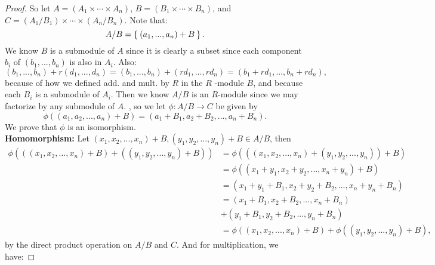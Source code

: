\documentclass[10pt,oneside,reqno]{amsart}
\theoremstyle{plain}
\theoremstyle{definition}
\theoremstyle{remark}
\begin{document}
\begin{enumerate}[label=\arabic*.]
\begin{proof}
So let $A = (A_1 \times \cdots \times A_n)$, $B = (B_1 \times \cdots \times B_n)$, and $C = (A_1/B_1) \times \cdots \times (A_n/B_n)$. Note that: 
$$
A/B = \Set{(a_1,...,a_n) + B}.
$$
We know $B$ is a submodule of $A$ since it is clearly a subset since each component $b_i$ of $(b_1,...,b_n)$ is also in $A_i$. Also: 
$$
(b_1,...,b_n) + r(d_1,...,d_n) = (b_1,...,b_n) + (rd_1,...,rd_n) = (b_1 + rd_1,...,b_n + rd_n),
$$
because of how we defined add. and mult. by $R$ in the $R$ -module $B$, and because each $B_i$ is a submodule of $A_i$. 
Then we know $A/B$ is an $R$-module since we may factorize by any submodule of $A$. , so we let $\phi: A/B \rightarrow C$ be given by $$\phi((a_1,a_2,...,a_n) + B) = (a_1+B_1,a_2+B_2,...,a_n+B_n).$$ 
We prove that $\phi$ is an isomorphism.\\
\textbf{Homomorphism: } Let $(x_1,x_2,...,x_n) + B,(y_1,y_2,...,y_n) + B \in A/B$, then 
\begin{equation}
\begin{aligned}
	\phi(((x_1,x_2,...,x_n) + B)
	+((y_1,y_2,...,y_n) + B)) 
	&= \phi(((x_1,x_2,...,x_n)
	+(y_1,y_2,...,y_n)) + B)\\ 
	&= \phi((x_1+y_1,x_2+y_2,...,x_n+y_n) + B) \\
	&= (x_1+y_1+B_1,x_2+y_2+B_2,...,x_n+y_n+B_n)\\
 	&= (x_1+B_1,x_2+B_2,...,x_n+B_n)\\
 	&+(y_1+B_1,y_2+B_2,...,y_n+B_n)\\
  	&= \phi((x_1,x_2,...,x_n) + B)+\phi((y_1,y_2,...,y_n) + B), 
\end{aligned}
\end{equation}
by the direct product operation on $A/B$ and $C$. And for multiplication, we have: 


\end{proof}
\end{enumerate}
\end{document}
